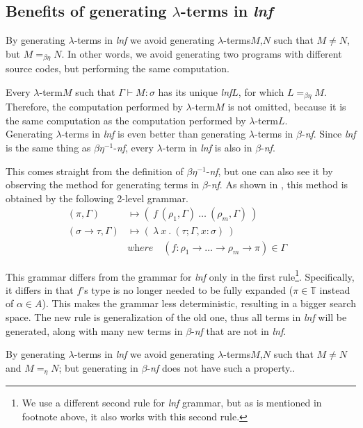 \documentclass{sig-alternate}
\newcommand{\lterm}{$\lambda$-term\xspace}
\newcommand{\lterms}{$\lambda$-terms\xspace}
\newcommand{\turst}[3]{$#1\vdash{}#2:#3$\xspace}
\newcommand{\GMS}{\turst{\Gamma}{M}{\sigma}}
\newcommand{\bnf}{$\beta$-\textit{nf}\xspace}
\newcommand{\beenf}{$\beta\eta^{-1}$-\textit{nf}\xspace}
\newcommand{\lnf}{\textit{lnf}\xspace}
\newcommand{\ar}{\rightarrow\xspace}
\newcommand{\T}{\mathbb{T}\xspace}
\newcommand{\gar}{\longmapsto}
\begin{document}
\subsection{Benefits of generating \lterms in \lnf}
\label{benefits}

By generating \lterms in \textit{lnf} we avoid generating 
\lterms $M$,$N$ such that $M \not= N$, but $M =_{\beta\eta} N$.
In other words, we avoid generating two programs with different 
source codes, but performing the same computation.

Every \lterm $M$ such that \GMS has its unique \lnf $L$, 
for which $L =_{\beta\eta} M$.
Therefore, the computation performed by \lterm $M$ 
is not omitted, because it is the same computation
as the computation performed by \lterm $L$. \\

Generating \lterms in \lnf is even better than generating 
\lterms in \bnf. Since \lnf is the same thing as \beenf,
every \lterm in \lnf is also in \bnf. 

This comes straight from the definition of \beenf, 
but one can also see it by observing the method for generating
terms in \bnf. As shown in \cite{barendregt10}, 
this method is obtained by the following 2-level grammar.
\begin{align*}
( \pi , \Gamma )  
&\gar
(~f~( \rho_1 , \Gamma )~\dots~( \rho_m , \Gamma )~)
\\ 
( \sigma \rightarrow \tau , \Gamma )  
&\gar
(~\lambda~x~.~( \tau ; \Gamma,x:\sigma )~)
&   
\\& \textit{where~~~} (f : \rho_1 \ar \dots \ar \rho_m \ar \pi) \in \Gamma
\end{align*}

This grammar differs from the grammar for \lnf only in the first rule\footnote{We use a different second rule for \lnf grammar, but as is mentioned in footnote above, it also works with this second rule.}. Specifically, it differs in that $f$'s type is no longer needed to be fully expanded ($\pi \in \T$ instead of $\alpha \in A$). This makes the grammar less deterministic,
resulting in a bigger search space. The new rule is generalization of the old one,
thus all terms in \lnf will be generated, along with many new terms in \bnf that 
are not in \lnf. 
    
By generating \lterms in \lnf we avoid generating 
\lterms $M$,$N$ such that $M \not= N$ and $M =_{\eta} N$; 
but generating in \bnf does not have such a property..\\
\end{document}
